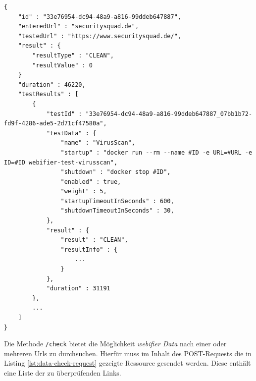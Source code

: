 \begin{scriptsize}
\begin{lstlisting}
{
    "id" : "33e76954-dc94-48a9-a816-99ddeb647887",
    "enteredUrl" : "securitysquad.de",
    "testedUrl" : "https://www.securitysquad.de/",
    "result" : {
        "resultType" : "CLEAN",
        "resultValue" : 0
    }
    "duration" : 46220,
    "testResults" : [
        {
            "testId" : "33e76954-dc94-48a9-a816-99ddeb647887_07bb1b72-fd9f-4286-ade5-2d71cf47580a",
            "testData" : {
                "name" : "VirusScan",
                "startup" : "docker run --rm --name #ID -e URL=#URL -e ID=#ID webifier-test-virusscan",
                "shutdown" : "docker stop #ID",
                "enabled" : true,
                "weight" : 5,
                "startupTimeoutInSeconds" : 600,
                "shutdownTimeoutInSeconds" : 30,
            },
            "result" : {
                "result" : "CLEAN",
                "resultInfo" : {
                    ...
                }
            },
            "duration" : 31191
        },
        ...
    ]
}
\end{lstlisting}
\end{scriptsize}

Die Methode \lstinline[style=eclipse]{/check} bietet die Möglichkeit \textit{webifier Data} nach
einer oder mehreren Urls zu durchsuchen. Hierfür muss im Inhalt des POST-Requests die in Listing \ref{lst:data-check-request} gezeigte Ressource gesendet werden. Diese enthält eine Liste der zu überprüfenden Links.

\newpage

